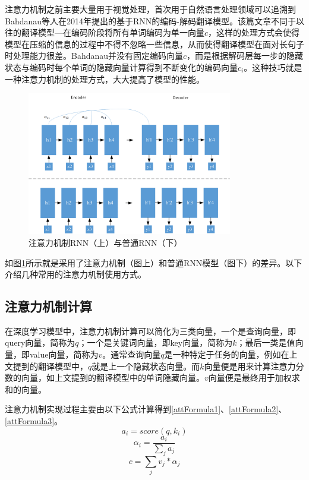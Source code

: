 注意力机制之前主要大量用于视觉处理，首次用于自然语言处理领域可以追溯到Bahdanau等人在2014年提出的基于RNN的编码-解码翻译模型。该篇文章不同于以往的翻译模型—在编码阶段将所有单词编码为单一向量$c$，这样的处理方式会使得模型在压缩的信息的过程中不得不忽略一些信息，从而使得翻译模型在面对长句子时处理能力很差。Bahdanau并没有固定编码向量$c$，而是根据解码层每一步的隐藏状态与编码时每个单词的隐藏向量计算得到不断变化的编码向量$c_i$。这种技巧就是一种注意力机制的处理方式，大大提高了模型的性能。
\begin{figure}[htb]%
	\setlength{\belowcaptionskip}{0pt}
	\centering
	\includegraphics[width=0.8\textwidth]{pic/2-10.png}
	\caption{注意力机制RNN（上）与普通RNN（下）}
	\label{rnn-att}
\end{figure}

如图\ref{rnn-att}所示就是采用了注意力机制（图上）和普通RNN模型（图下）的差异。以下介绍几种常用的注意力机制使用方式。
\subsection{注意力机制计算}
在深度学习模型中，注意力机制计算可以简化为三类向量，一个是查询向量，即query向量，简称为$q$；一个是关键词向量，即key向量，简称为$k$；最后一类是值向量，即value向量，简称为$v$。通常查询向量$q$是一种特定于任务的向量，例如在上文提到的翻译模型中，$q$就是上一个隐藏状态向量。而$k$向量便是用来计算注意力分数的向量，如上文提到的翻译模型中的单词隐藏向量。$v$向量便是最终用于加权求和的向量。

注意力机制实现过程主要由以下公式计算得到\ref{attFormula1}、\ref{attFormula2}、\ref{attFormula3}。
\begin{equation}\label{attFormula1}
	a_i = score(q,k_i)
\end{equation}
\begin{equation}\label{attFormula2}
	\alpha_i = \frac{a_i}{\sum_{j}a_j}
\end{equation}
\begin{equation}\label{attFormula3}
	c=\sum_{j}v_j* \alpha_j
\end{equation}

